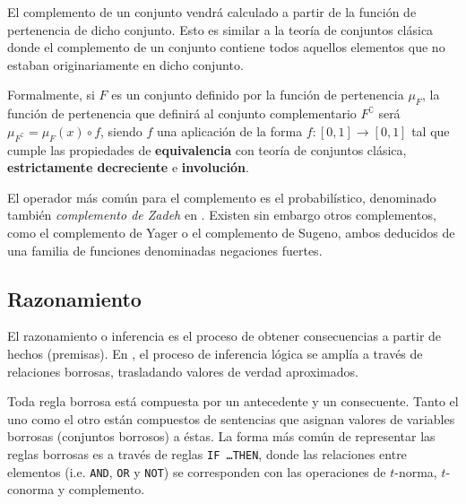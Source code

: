 El complemento de un conjunto vendrá calculado a partir de la función de pertenencia de dicho conjunto. Esto es similar a la teoría de conjuntos clásica donde el complemento de un conjunto contiene todos aquellos elementos que no estaban originariamente en dicho conjunto.

Formalmente, si $F$ es un conjunto definido por la función de pertenencia $\mu_F$, la función de pertenencia que definirá al conjunto complementario $F^\complement$ será $\mu_{F^\complement} = \mu_F(x) \circ f$, siendo $f$ una aplicación de la forma $f : [0,1] \rightarrow [0,1]$ tal que cumple las propiedades de \textbf{equivalencia} con teoría de conjuntos clásica, \textbf{estrictamente decreciente} e \textbf{involución}.

El operador más común para el complemento es el probabilístico, denominado también \textit{complemento de Zadeh} en . Existen sin embargo otros complementos, como el complemento de Yager o el complemento de Sugeno, ambos deducidos de una familia de funciones denominadas negaciones fuertes.

\subsection{Razonamiento}

El razonamiento o inferencia es el proceso de obtener consecuencias a partir de hechos (premisas). En , el proceso de inferencia lógica se amplía a través de relaciones borrosas, trasladando valores de verdad aproximados.

Toda regla borrosa está compuesta por un antecedente y un consecuente. Tanto el uno como el otro están compuestos de sentencias que asignan valores de variables borrosas (conjuntos borrosos) a éstas. La forma más común de representar las reglas borrosas es a través de reglas \texttt{IF \ldots THEN}, donde las relaciones entre elementos (i.e. \texttt{AND}, \texttt{OR} y \texttt{NOT}) se corresponden con las operaciones de $t$-norma, $t$-conorma y complemento.

